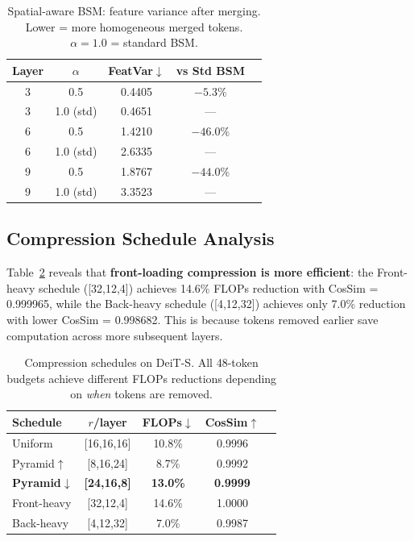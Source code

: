 \documentclass[10pt,twocolumn,letterpaper]{article}
\begin{document}
\begin{table}[t]
\centering
\caption{Spatial-aware BSM: feature variance after merging. Lower = more
homogeneous merged tokens. $\alpha = 1.0$ = standard BSM.}
\label{tab:spatial}
\small
\begin{tabular}{ccccc}
\toprule
Layer & $\alpha$ & FeatVar$\downarrow$ & vs Std BSM \\
\midrule
3 & 0.5 & 0.4405 & $-5.3\%$ \\
3 & 1.0 (std) & 0.4651 & --- \\
\midrule
6 & 0.5 & 1.4210 & $-46.0\%$ \\
6 & 1.0 (std) & 2.6335 & --- \\
\midrule
9 & 0.5 & 1.8767 & $-44.0\%$ \\
9 & 1.0 (std) & 3.3523 & --- \\
\bottomrule
\end{tabular}
\end{table}


\subsection{Compression Schedule Analysis}

Table~\ref{tab:schedule} reveals that \textbf{front-loading compression is
more efficient}: the Front-heavy schedule ([32,12,4]) achieves 14.6\% FLOPs
reduction with CosSim = 0.999965, while the Back-heavy schedule ([4,12,32])
achieves only 7.0\% reduction with lower CosSim = 0.998682. This is because
tokens removed earlier save computation across more subsequent layers.

\begin{table}[t]
\centering
\caption{Compression schedules on DeiT-S. All 48-token budgets achieve different
FLOPs reductions depending on \textit{when} tokens are removed.}
\label{tab:schedule}
\small
\begin{tabular}{lcccc}
\toprule
Schedule & $r$/layer & FLOPs$\downarrow$ & CosSim$\uparrow$ \\
\midrule
Uniform        & [16,16,16] & 10.8\% & 0.9996 \\
Pyramid$\uparrow$ & [8,16,24]  & 8.7\%  & 0.9992 \\
\textbf{Pyramid$\downarrow$} & \textbf{[24,16,8]}  & \textbf{13.0\%} & \textbf{0.9999} \\
Front-heavy    & [32,12,4]  & 14.6\% & 1.0000 \\
Back-heavy     & [4,12,32]  & 7.0\%  & 0.9987 \\
\bottomrule
\end{tabular}
\end{table}
\end{document}
